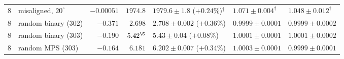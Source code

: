 \begin{table}[ht]
\begin{tabular}{@{}llrrlll@{}}
    8 & misaligned, $20^\circ$      & $-0.00051$ & $1974.8$ & $1979.6\pm1.8$ ($+0.24\%$)$^\dagger$ & $1.071\pm0.004^\dagger$ & $1.048\pm0.012^\dagger$ \\
    8 & random binary (302)         & $-0.371$  & $2.698$  & $2.708\pm0.002$ ($+0.36\%$)  & $0.9999\pm0.0001$ & $0.9999\pm0.0002$ \\
    8 & random binary (303)         & $-0.190$  & $5.42^\S$ & $5.43\pm0.04$ ($+0.08\%$)   & $1.0001\pm0.0001$ & $1.0001\pm0.0002$ \\
    8 & random MPS (303)            & $-0.164$  & $6.181$  & $6.202\pm0.007$ ($+0.34\%$)  & $1.0003\pm0.0001$ & $0.9999\pm0.0001$ \\
    \bottomrule
  \end{tabular}
\end{table}

